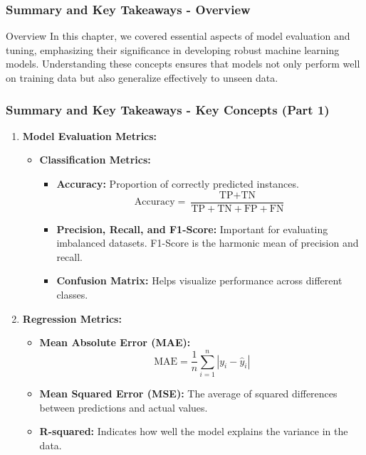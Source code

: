 \documentclass[aspectratio=169]{beamer}
\begin{document}
\begin{frame}[fragile]
    \frametitle{Summary and Key Takeaways - Overview}
    \begin{block}{Overview}
        In this chapter, we covered essential aspects of model evaluation and tuning, emphasizing their significance in developing robust machine learning models. 
        Understanding these concepts ensures that models not only perform well on training data but also generalize effectively to unseen data.
    \end{block}
\end{frame}

\begin{frame}[fragile]
    \frametitle{Summary and Key Takeaways - Key Concepts (Part 1)}
    \begin{enumerate}
        \item \textbf{Model Evaluation Metrics:}
        \begin{itemize}
            \item \textbf{Classification Metrics:}
            \begin{itemize}
                \item \textbf{Accuracy:} Proportion of correctly predicted instances.
                \[
                \text{Accuracy} = \frac{\text{TP} + \text{TN}}{\text{TP} + \text{TN} + \text{FP} + \text{FN}}
                \]
                \item \textbf{Precision, Recall, and F1-Score:} Important for evaluating imbalanced datasets. F1-Score is the harmonic mean of precision and recall.
                \item \textbf{Confusion Matrix:} Helps visualize performance across different classes.
            \end{itemize}
        \end{itemize}
        
        \item \textbf{Regression Metrics:}
        \begin{itemize}
            \item \textbf{Mean Absolute Error (MAE):}
            \[
            \text{MAE} = \frac{1}{n} \sum_{i=1}^{n} |y_i - \hat{y}_i|
            \]
            \item \textbf{Mean Squared Error (MSE):} The average of squared differences between predictions and actual values.
            \item \textbf{R-squared:} Indicates how well the model explains the variance in the data.
        \end{itemize}
    \end{enumerate}
\end{frame}
\end{document}
